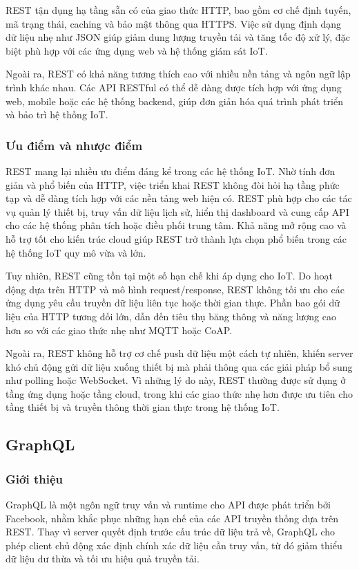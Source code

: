 REST tận dụng hạ tầng sẵn có của giao thức HTTP, bao gồm cơ chế định tuyến, mã
trạng thái, caching và bảo mật thông qua HTTPS. Việc sử dụng định dạng dữ liệu
nhẹ như JSON giúp giảm dung lượng truyền tải và tăng tốc độ xử lý, đặc biệt phù
hợp với các ứng dụng web và hệ thống giám sát IoT.

Ngoài ra, REST có khả năng tương thích cao với nhiều nền tảng và ngôn ngữ lập
trình khác nhau. Các API RESTful có thể dễ dàng được tích hợp với ứng dụng web,
mobile hoặc các hệ thống backend, giúp đơn giản hóa quá trình phát triển và bảo
trì hệ thống IoT.


\subsubsection{Ưu điểm và nhược điểm}
REST mang lại nhiều ưu điểm đáng kể trong các hệ thống IoT. Nhờ tính đơn giản và
phổ biến của HTTP, việc triển khai REST không đòi hỏi hạ tầng phức tạp và dễ dàng
tích hợp với các nền tảng web hiện có. REST phù hợp cho các tác vụ quản lý thiết
bị, truy vấn dữ liệu lịch sử, hiển thị dashboard và cung cấp API cho các hệ thống
phân tích hoặc điều phối trung tâm. Khả năng mở rộng cao và hỗ trợ tốt cho kiến
trúc cloud giúp REST trở thành lựa chọn phổ biến trong các hệ thống IoT quy mô
vừa và lớn.

Tuy nhiên, REST cũng tồn tại một số hạn chế khi áp dụng cho IoT. Do hoạt động dựa
trên HTTP và mô hình request/response, REST không tối ưu cho các ứng dụng yêu cầu
truyền dữ liệu liên tục hoặc thời gian thực. Phần bao gói dữ liệu của HTTP tương
đối lớn, dẫn đến tiêu thụ băng thông và năng lượng cao hơn so với các giao thức
nhẹ như MQTT hoặc CoAP.

Ngoài ra, REST không hỗ trợ cơ chế push dữ liệu một cách tự nhiên, khiến server
khó chủ động gửi dữ liệu xuống thiết bị mà phải thông qua các giải pháp bổ sung
như polling hoặc WebSocket. Vì những lý do này, REST thường được sử dụng ở tầng
ứng dụng hoặc tầng cloud, trong khi các giao thức nhẹ hơn được ưu tiên cho tầng
thiết bị và truyền thông thời gian thực trong hệ thống IoT.


\subsection{GraphQL}

\subsubsection{Giới thiệu}
GraphQL là một ngôn ngữ truy vấn và runtime cho API được phát triển bởi Facebook,
nhằm khắc phục những hạn chế của các API truyền thống dựa trên REST. Thay vì
server quyết định trước cấu trúc dữ liệu trả về, GraphQL cho phép client chủ động
xác định chính xác dữ liệu cần truy vấn, từ đó giảm thiểu dữ liệu dư thừa và tối
ưu hiệu quả truyền tải.

